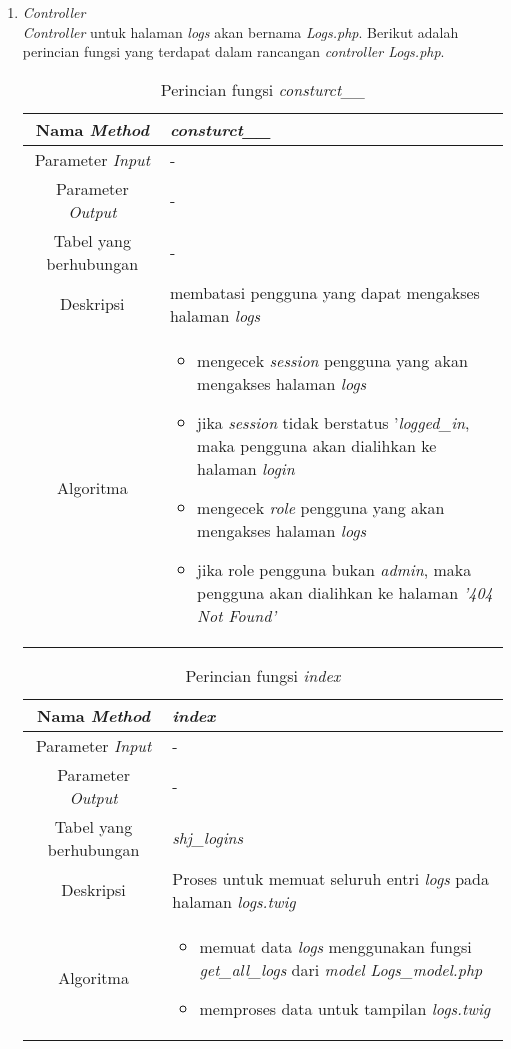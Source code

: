 \begin{enumerate}
	\item \textit{Controller} \\
	\textit{Controller} untuk halaman \textit{logs} akan bernama \textit{Logs.php}. Berikut adalah perincian fungsi yang terdapat dalam rancangan \textit{controller Logs.php}.
	\begin{table}[H]
		\caption{Perincian fungsi \textit{consturct\_\_}}
		\begin{tabular}{|c|p{11cm}|}
			\hline
			Nama \textit{Method} 	& 	\textit{consturct\_\_} 	\\
			\hline
			Parameter \textit{Input} & - \\
			\hline
			Parameter \textit{Output} &  - \\
			\hline
			Tabel yang berhubungan & - \\
			\hline
			Deskripsi	& membatasi pengguna yang dapat mengakses halaman \textit{logs}	 \\
			\hline
			Algoritma	& \begin{itemize}
				\item mengecek \textit{session} pengguna yang akan mengakses halaman \textit{logs}
				\item jika \textit{session} tidak berstatus '\textit{logged\_in}, maka pengguna akan dialihkan ke halaman \textit{login}
				\item mengecek \textit{role} pengguna yang akan mengakses halaman \textit{logs}
				\item jika role pengguna bukan \textit{admin}, maka pengguna akan dialihkan ke halaman \textit{'404 Not Found'}
			\end{itemize} \\
			\hline
		\end{tabular}
	\end{table}
	
	\begin{table}[H]
		\caption{Perincian fungsi \textit{index}}
		\begin{tabular}{|c|p{11cm}|}
			\hline
			Nama \textit{Method} 	& 	\textit{index} 	\\
			\hline
			Parameter \textit{Input} & - \\
			\hline
			Parameter \textit{Output} &  - \\
			\hline
			Tabel yang berhubungan & \textit{shj\_logins} \\
			\hline
			Deskripsi	& Proses untuk memuat seluruh entri \textit{logs} pada halaman \textit{logs.twig}	 \\
			\hline
			Algoritma	& \begin{itemize}
				\item memuat data \textit{logs} menggunakan fungsi \textit{get\_all\_logs} dari \textit{model Logs\_model.php}
				\item memproses data untuk tampilan \textit{logs.twig}
			\end{itemize} \\
			\hline
		\end{tabular}
	\end{table}
\end{enumerate}

